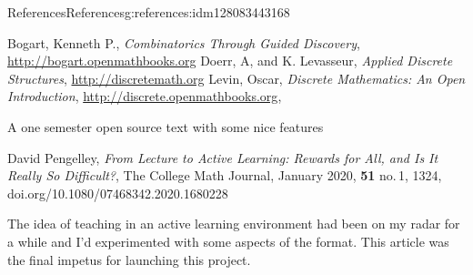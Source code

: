 \documentclass[oneside,10pt,]{book}
\newcommand{\xreffont}{\relax}
\numberwithin{equation}{section}
\begin{document}
\begin{references-chapter-numberless}{References}{}{References}{}{}{g:references:idm128083443168}
%
\begin{referencelist}
\hypertarget{x:biblio:biblio-bogart-2017}{}Bogart, Kenneth P., \textit{Combinatorics Through Guided Discovery}, \href{http://bogart.openmathbooks.org}{http:\slash{}\slash{}bogart.openmathbooks.org}
\hypertarget{x:biblio:biblio-doerr-2019}{}Doerr, A, and K. Levasseur, \textit{Applied Discrete Structures}, \href{http://discretemath.org}{http:\slash{}\slash{}discretemath.org}
\hypertarget{x:biblio:biblio-levin-2020}{}Levin, Oscar, \textit{Discrete Mathematics: An Open Introduction}, \href{http://discrete.openmathbooks.org}{http:\slash{}\slash{}discrete.openmathbooks.org}, \par%
A one semester open source text with some nice features%

\hypertarget{x:biblio:biblio-pengelley}{}David Pengelley, \textit{From Lecture to Active Learning: Rewards for All, and Is It Really So Difficult?}, The College Math Journal, January 2020, \textbf{51} no.\@\,1, 13\textendash{}24, doi.org\slash{}10.1080\slash{}07468342.2020.1680228\par%
The idea of teaching in an active learning environment had been on my radar for a while and I'd experimented with some aspects of the format. This article was the final impetus for launching this project.%

\end{referencelist}
\end{references-chapter-numberless}
%
{\xreffont\printindex}
%
\end{document}
